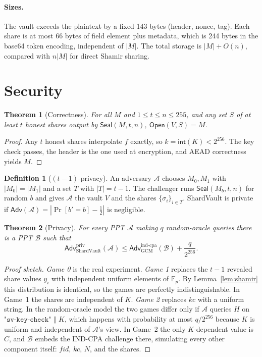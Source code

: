 \documentclass[11pt]{article}
\newtheorem{theorem}{Theorem}
\theoremstyle{definition}
\newtheorem{definition}{Definition}
\newcommand{\F}{\mathbb{F}_p}
\newcommand{\Adv}{\mathsf{Adv}}
\begin{document}
\paragraph{Sizes.} The vault exceeds the plaintext by a fixed 143 bytes (header, nonce, tag). Each share is at most 66 bytes of field element plus metadata, which is 244 bytes in the base64 token encoding, independent of $|M|$. The total storage is $|M| + O(n)$, compared with $n|M|$ for direct Shamir sharing.

\section{Security}\label{sec:security}
\begin{theorem}[Correctness]
For all $M$ and $1 \le t \le n \le 255$, and any set $S$ of at least $t$ honest shares output by $\mathsf{Seal}(M,t,n)$, $\mathsf{Open}(V, S) = M$.
\end{theorem}
\begin{proof}
Any $t$ honest shares interpolate $f$ exactly, so $k = \mathsf{int}(K) < 2^{256}$. The key check passes, the header is the one used at encryption, and AEAD correctness yields $M$.
\end{proof}

\begin{definition}[$(t-1)$-privacy]
An adversary $\mathcal{A}$ chooses $M_0, M_1$ with $|M_0| = |M_1|$ and a set $T$ with $|T| = t-1$. The challenger runs $\mathsf{Seal}(M_b, t, n)$ for random $b$ and gives $\mathcal{A}$ the vault $V$ and the shares $\{\sigma_i\}_{i\in T}$. ShardVault is private if $\Adv(\mathcal{A}) = |\Pr[b' = b] - \tfrac12|$ is negligible.
\end{definition}

\begin{theorem}[Privacy]\label{thm:priv}
For every PPT $\mathcal{A}$ making $q$ random-oracle queries there is a PPT $\mathcal{B}$ such that
\[
  \Adv^{\text{priv}}_{\text{ShardVault}}(\mathcal{A}) \le \Adv^{\text{ind-cpa}}_{\text{GCM}}(\mathcal{B}) + \frac{q}{2^{256}} .
\]
\end{theorem}
\begin{proof}[Proof sketch]
\emph{Game 0} is the real experiment. \emph{Game 1} replaces the $t-1$ revealed share values $y_i$ with independent uniform elements of $\F$. By Lemma~\ref{lem:shamir} this distribution is identical, so the games are perfectly indistinguishable. In Game~1 the shares are independent of $K$. \emph{Game 2} replaces $\mathit{kc}$ with a uniform string. In the random-oracle model the two games differ only if $\mathcal{A}$ queries $H$ on $\texttt{"sv-key-check"}\|K$, which happens with probability at most $q/2^{256}$ because $K$ is uniform and independent of $\mathcal{A}$'s view. In Game~2 the only $K$-dependent value is $C$, and $\mathcal{B}$ embeds the IND-CPA challenge there, simulating every other component itself: $\mathit{fid}$, $\mathit{kc}$, $N$, and the shares.
\end{proof}
\end{document}
